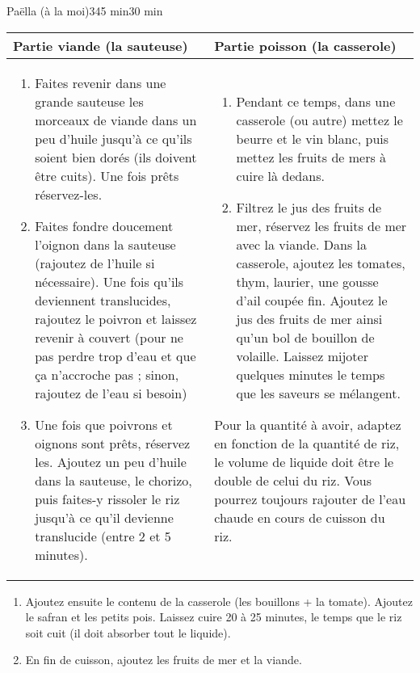 \begin{recette}{Paëlla (à la moi)}{3}{45 min}{30 min}
\begin{preparation*}
\begin{tabular}{p{}|p{}}
Partie viande (la sauteuse)& Partie poisson (la casserole)\\\hline
\begin{enumerate}
\item Faites revenir dans une grande sauteuse les morceaux de viande dans un peu d'huile jusqu'à ce qu'ils soient bien dorés (ils doivent être cuits). Une fois prêts réservez-les.
\item Faites fondre doucement l'oignon dans la sauteuse (rajoutez de l'huile si nécessaire). Une fois qu'ils deviennent translucides, rajoutez le poivron et laissez revenir à couvert (pour ne pas perdre trop d'eau et que ça n'accroche pas ; sinon, rajoutez de l'eau si besoin)
\item Une fois que poivrons et oignons sont prêts, réservez les. Ajoutez un peu d'huile dans la sauteuse, le chorizo, puis faites-y rissoler le riz jusqu'à ce qu'il devienne translucide (entre 2 et 5 minutes).
\end{enumerate}&\begin{enumerate}
\item Pendant ce temps, dans une casserole (ou autre) mettez le beurre et le vin blanc, puis mettez les fruits de mers à cuire là dedans\footnotemark.
\item Filtrez le jus des fruits de mer, réservez les fruits de mer avec la viande. Dans la casserole, ajoutez les tomates, thym, laurier, une gousse d'ail coupée fin. Ajoutez le jus des fruits de mer ainsi qu'un bol de bouillon de volaille. Laissez mijoter quelques minutes le temps que les saveurs se mélangent.
\end{enumerate}
\begin{remarque}
Pour la quantité à avoir, adaptez en fonction de la quantité de riz, le volume de liquide doit être le double de celui du riz. Vous pourrez toujours rajouter de l'eau chaude en cours de cuisson du riz.
\end{remarque}
\end{tabular}
\begin{enumerate}
\item Ajoutez ensuite le contenu de la casserole (les bouillons + la tomate). Ajoutez le safran et les petits pois. Laissez cuire 20 à 25 minutes, le temps que le riz soit cuit (il doit absorber tout le liquide).
\item En fin de cuisson, ajoutez les fruits de mer et la viande.
\end{enumerate}
\end{preparation*}

\end{recette}


